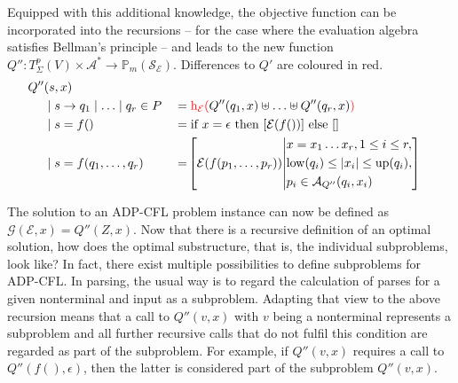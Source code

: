 \documentclass[
    a4paper,
    12pt,
    twoside,
    BCOR=12mm,
    parskip=half,
    chapterprefix,
    numbers=noenddot,
    bibliography=totoc
]{scrbook}
\begin{document}
Equipped with this additional knowledge, the objective function can be incorporated into the recursions -- for the case where the evaluation algebra satisfies Bellman's principle -- and leads to the new function $Q'': T^p_\Sigma(V) \times \mathcal{A}^* \to \mathbb{P}_m(\mathcal{S}_\mathcal{E})$. Differences to $Q'$ are coloured in red.
\begin{align}
	Q''&(s,x) \label{eq:q''}\\
	&\mid s \to q_1 \mid \ldots \mid q_r \in P &&= \textcolor{red}{\op{h}_\mathcal{E}(} Q''(q_1,x) \uplus \ldots \uplus Q''(q_r,x) \textcolor{red}{)} \nonumber\\
	&\mid s=f() &&= \text{if $x=\epsilon$ then $[\mathcal{E}(f())]$ else $[]$} \nonumber\\
	&\mid s=f(q_1,\ldots,q_r) &&= \!\left[ \mathcal{E}(f(p_1,\ldots,p_r)) \middle\vert
			\begin{aligned}
				&x=x_1 \ldots x_r, 1 \leq i \leq r,\\
				&\op{low}(q_i) \leq |x_i| \leq \op{up}(q_i),\\
				&p_i \in \mathcal{A}_{Q''}(q_i,x_i)
			\end{aligned}
			\right] \nonumber
\end{align}

The solution to an ADP-CFL problem instance can now be defined as $\mathcal{G}(\mathcal{E},x)=Q''(Z,x)$. Now that there is a recursive definition of an optimal solution, how does the optimal substructure, that is, the individual subproblems, look like? In fact, there exist multiple possibilities to define subproblems for ADP-CFL. In parsing, the usual way is to regard the calculation of parses for a given nonterminal and input as a subproblem. Adapting that view to the above recursion means that a call to $Q''(v,x)$ with $v$ being a nonterminal represents a subproblem and all further recursive calls that do not fulfil this condition are regarded as part of the subproblem. For example, if $Q''(v,x)$ requires a call to $Q''(f(),\epsilon)$, then the latter is considered part of the subproblem $Q''(v,x)$.
\end{document}
